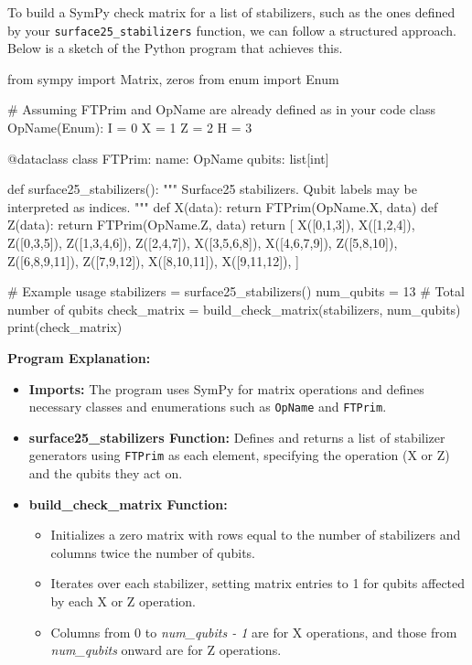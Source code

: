 \begin{airesult}
To build a SymPy check matrix for a list of stabilizers, such as the ones defined by your
\verb|surface25_stabilizers| function, we can follow a structured approach. Below is a sketch of the
Python program that achieves this.

\vsp

\begin{python}
from sympy import Matrix, zeros
from enum import Enum

# Assuming FTPrim and OpName are already defined as in your code
class OpName(Enum):
  I = 0
  X = 1
  Z = 2
  H = 3

@dataclass
class FTPrim:
  name: OpName
  qubits: list[int]

def surface25_stabilizers():
  """ Surface25 stabilizers. Qubit labels may be interpreted as indices. """
  def X(data):
    return FTPrim(OpName.X, data)
  def Z(data):
    return FTPrim(OpName.Z, data)
  return [
            X([0,1,3]), X([1,2,4]),
    Z([0,3,5]), Z([1,3,4,6]), Z([2,4,7]),
           X([3,5,6,8]), X([4,6,7,9]),
    Z([5,8,10]), Z([6,8,9,11]), Z([7,9,12]),
           X([8,10,11]), X([9,11,12]),
  ]

# Example usage
stabilizers = surface25_stabilizers()
num_qubits = 13  # Total number of qubits
check_matrix = build_check_matrix(stabilizers, num_qubits)
print(check_matrix)
\end{python}

\vsp

\textbf{Program Explanation:}

\begin{itemize}
  \item \textbf{Imports:} The program uses SymPy for matrix operations and defines necessary classes
        and enumerations such as \verb|OpName| and \verb|FTPrim|.

  \item \textbf{surface25_stabilizers Function:} Defines and returns a list of stabilizer generators
        using \verb|FTPrim| as each element, specifying the operation (X or Z) and the qubits they
        act on.

  \item \textbf{build_check_matrix Function:}
  \begin{itemize}
    \item Initializes a zero matrix with rows equal to the number of stabilizers and columns twice
          the number of qubits.
    \item Iterates over each stabilizer, setting matrix entries to 1 for qubits affected by each X
          or Z operation.
    \item Columns from 0 to \textit{num\_qubits - 1} are for X operations, and those from
          \textit{num\_qubits} onward are for Z operations.
  \end{itemize}


\end{itemize}
\end{airesult}
